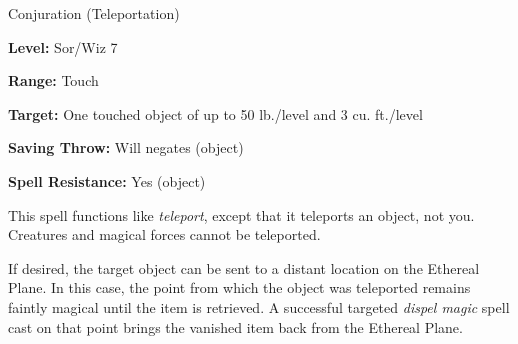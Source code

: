 
Conjuration (Teleportation)

\textbf{Level:} Sor/Wiz 7

\textbf{Range:} Touch

\textbf{Target:} One touched object of up to 50 lb./level and 3 cu. ft./level

\textbf{Saving Throw:} Will negates (object)

\textbf{Spell Resistance:} Yes (object)

This spell functions like \textit{teleport}, except that it teleports an object, 
not you. Creatures and magical forces cannot be teleported.

If desired, the target object can be sent to a distant location on the Ethereal 
Plane. In this case, the point from which the object was teleported remains faintly 
magical until the item is retrieved. A successful targeted \textit{dispel magic 
}spell cast on that point brings the vanished item back from the Ethereal Plane.

